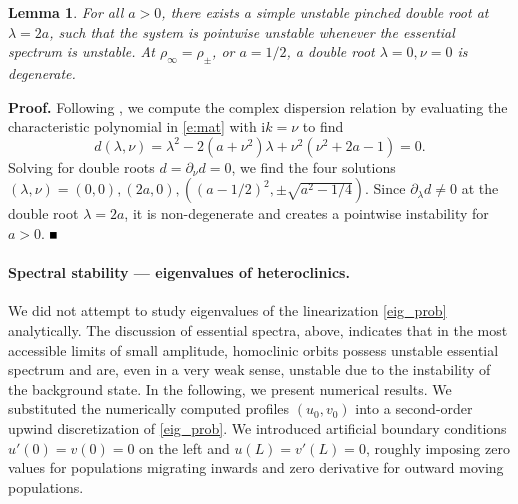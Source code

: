 \documentclass[10pt]{article}
\newtheorem{Lemma}{Lemma}[section]
\newenvironment{Proof}%
 {\begin{trivlist} \item[]{\bf Proof. }}%
 {\hspace*{\fill}$\rule{.4\baselineskip}{.4\baselineskip}$\end{trivlist}}
\newcommand{\rmi}{\mathrm{i}}
\begin{document}
\begin{Lemma}\label{l:pdr}
 For all $a>0$, there exists a simple unstable pinched double root at $\lambda=2a$, such that the system is pointwise unstable whenever the essential spectrum is unstable. At $\rho_\infty=\rho_\pm$, or $a=1/2$, a double root $\lambda=0,\nu=0$ is degenerate. 
\end{Lemma}
\begin{Proof}
 Following \cite{holzerscheel}, we compute the complex dispersion relation by evaluating the characteristic polynomial in \eqref{e:mat} with $\rmi k=\nu$ to find
 \[
 d(\lambda,\nu)= \lambda^2-2(a+\nu^2)\lambda +\nu^2(\nu^2+2a-1)=0.
 \]
 Solving for double roots $d=\partial_\nu d=0$, we find the four solutions $(\lambda,\nu)=(0,0),(2a,0),((a-1/2)^2,\pm\sqrt{a^2-1/4})$. Since $\partial_\lambda d\neq 0$ at the double root $\lambda=2a$, it is non-degenerate and creates a pointwise instability for $a>0$. 
\end{Proof}






\paragraph{Spectral stability --- eigenvalues of heteroclinics.}
We did not attempt to study eigenvalues of the linearization \eqref{eig_prob} analytically. The discussion of essential spectra, above, indicates that in the most accessible limits of small amplitude, homoclinic orbits possess unstable essential spectrum and are, even in a very weak sense, unstable due to the instability of the background state. In the following, we present numerical results. We substituted the numerically computed profiles $(u_0,v_0)$ into a second-order upwind discretization of \eqref{eig_prob}. We introduced artificial boundary conditions $u'(0) = v(0) = 0$ on the left and $u(L) = v'(L) = 0$, roughly imposing zero values for populations migrating inwards and zero derivative for outward moving populations. 
\end{document}
